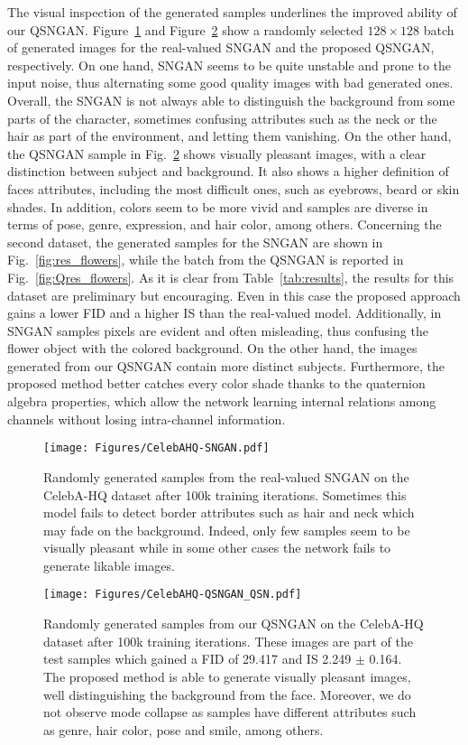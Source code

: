 \documentclass[graybox]{svmult}
\begin{document}
The visual inspection of the generated samples underlines the improved ability of our QSNGAN. Figure~\ref{fig:res_celeba} and Figure~\ref{fig:Qres_celeba} show a randomly selected $128 \times 128$ batch of generated images for the real-valued SNGAN and the proposed QSNGAN, respectively. On one hand, SNGAN seems to be quite unstable and prone to the input noise, thus alternating some good quality images with bad generated ones. Overall, the SNGAN is not always able to distinguish the background from some parts of the character, sometimes confusing attributes such as the neck or the hair as part of the environment, and letting them vanishing. On the other hand, the QSNGAN sample in Fig.~\ref{fig:Qres_celeba} shows visually pleasant images, with a clear distinction between subject and background. It also shows a higher definition of faces attributes, including the most difficult ones, such as eyebrows, beard or skin shades. In addition, colors seem to be more vivid and samples are diverse in terms of pose, genre, expression, and hair color, among others. 
Concerning the second dataset, the generated samples for the SNGAN are shown in Fig.~\ref{fig:res_flowers}, while the batch from the QSNGAN is reported in Fig.~\ref{fig:Qres_flowers}. As it is clear from Table~\ref{tab:results}, the results for this dataset are preliminary but encouraging. Even in this case the proposed approach gains a lower FID and a higher IS than the real-valued model. Additionally, in SNGAN samples pixels are evident and often misleading, thus confusing the flower object with the colored background. On the other hand, the images generated from our QSNGAN contain more distinct subjects. Furthermore, the proposed method better catches every color shade thanks to the quaternion algebra properties, which allow the network learning internal relations among channels without losing intra-channel information.

\begin{figure}[t]
    \centering
    \texttt{[image: Figures/CelebAHQ-SNGAN.pdf]}
    \caption{Randomly generated samples from the real-valued SNGAN on the CelebA-HQ dataset after 100k training iterations. Sometimes this model fails to detect border attributes such as hair and neck which may fade on the background. Indeed, only few samples seem to be visually pleasant while in some other cases the network fails to generate likable images.}
    \label{fig:res_celeba}
\end{figure}

\begin{figure}[t!]
    \centering
    \texttt{[image: Figures/CelebAHQ-QSNGAN\_QSN.pdf]}
    \caption{Randomly generated samples from our QSNGAN on the CelebA-HQ dataset after 100k training iterations. These images are part of the test samples which gained a FID of 29.417 and IS 2.249 $\pm$ 0.164. The proposed method is able to generate visually pleasant images, well distinguishing the background from the face. Moreover, we do not observe mode collapse as samples have different attributes such as genre, hair color, pose and smile, among others.}
    \label{fig:Qres_celeba}
\end{figure}
\end{document}
